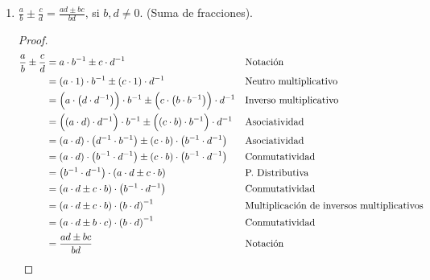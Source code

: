 \documentclass[11pt]{article}
\begin{document}
\begin{enumerate}[label=\alph*)]
    \item $\frac{a}{b} \pm \frac{c}{d} = \frac{ad \pm bc}{bd} $, si $b, d \neq 0$. (Suma de fracciones).
    \vspace{-1em}\begin{proof} 
    \begin{align*}
    \frac{a}{b} \pm \frac{c}{d}  &=	a \cdot b^{-1} \pm c \cdot d^{-1} && \text{Notación}\\
    &=	\left( a \cdot 1 \right)   \cdot b^{-1} \pm \left( c \cdot 1 \right) \cdot d^{-1} && \text{Neutro multiplicativo}\\
    &=	\Bigl( a \cdot  \left( d \cdot d^{-1} \right) \Bigr) \cdot b^{-1} \pm \Bigl( c \cdot  \left( b \cdot b^{-1}  \right)  \Bigr)  \cdot d^{-1} && \text{Inverso multiplicativo}\\
    &=	\Bigl(  \left( a \cdot d \right) \cdot d^{-1} \Bigr) \cdot b^{-1} \pm \Bigl(  \left( c \cdot b \right) \cdot b^{-1} \Bigr) \cdot d^{-1} && \text{Asociatividad}\\
    &=	\left( a \cdot d \right)  \cdot  \left( d^{-1} \cdot b^{-1}  \right) \pm \left( c \cdot b \right)  \cdot  \left( b^{-1} \cdot d^{-1}  \right) && \text{Asociatividad}\\
    &=	\left( a \cdot d \right)  \cdot  \left( b^{-1} \cdot d^{-1}  \right) \pm \left( c \cdot b \right)  \cdot  \left( b^{-1} \cdot d^{-1}  \right) && \text{Conmutatividad}\\
    &=	\left( b^{-1} \cdot d^{-1}  \right) \cdot \left( a \cdot d \pm c \cdot b \right) && \text{P. Distributiva}\\
    &=	\left( a \cdot d \pm c \cdot b \right) \cdot  \left( b^{-1} \cdot d^{-1} \right) && \text{Conmutatividad}\\
    &=	\left( a \cdot d \pm c \cdot b \right) \cdot  \left( b \cdot d \right)^{-1} && \text{Multiplicación de inversos multiplicativos}\\
    &=	\left( a \cdot d \pm b \cdot c \right) \cdot \left( b \cdot d \right)^{-1} && \text{Conmutatividad}\\
    &=	\frac{ad \pm bc}{bd} && \text{Notación} \qedhere
    \end{align*} 
    \end{proof} \vspace{-1em}


\end{enumerate}
\end{document}
